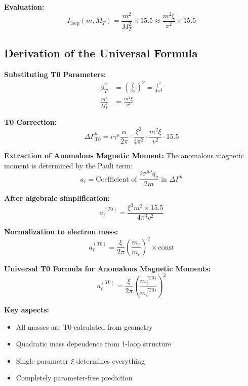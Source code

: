 \documentclass[12pt,a4paper]{article}
\numberwithin{equation}{section}
\begin{document}
	\textbf{Evaluation:}
	\begin{equation}
		I_{\text{loop}}(m,M_T) = \frac{m^2}{M_T^2} \times 15.5 \approx \frac{m^2 \xi}{v^2} \times 15.5
	\end{equation}
	
	\subsection{Derivation of the Universal Formula}
	
	\textbf{Substituting T0 Parameters:}
	\begin{align}
		\beta_T^2 &= \left(\frac{\xi}{2\pi}\right)^2 = \frac{\xi^2}{4\pi^2}\\
		\frac{m^2}{M_T^2} &= \frac{m^2 \xi}{v^2}
	\end{align}
	
	\textbf{T0 Correction:}
	\begin{equation}
		\Delta\Gamma^\mu_{\text{T0}} = i\gamma^\mu \frac{\alpha}{2\pi} \cdot \frac{\xi^2}{4\pi^2} \cdot \frac{m^2 \xi}{v^2} \cdot 15.5
	\end{equation}
	
	\textbf{Extraction of Anomalous Magnetic Moment:}
	The anomalous magnetic moment is determined by the Pauli term:
	\begin{equation}
		a_\ell = \text{Coefficient of } \frac{i\sigma^{\mu\nu}q_\nu}{2m} \text{ in } \Delta\Gamma^\mu
	\end{equation}
	
	\textbf{After algebraic simplification:}
	\begin{equation}
		a_\ell^{(T0)} = \frac{\xi^3 m^2 \times 15.5}{4\pi^3 v^2}
	\end{equation}
	
	\textbf{Normalization to electron mass:}
	\begin{equation}
		a_\ell^{(T0)} = \frac{\xi}{2\pi} \left(\frac{m_\ell}{m_e}\right)^2 \times \text{const}
	\end{equation}
	
	\begin{t0formula}
		\textbf{Universal T0 Formula for Anomalous Magnetic Moments:}
		\begin{equation}
			\boxed{a_\ell^{(T0)} = \frac{\xi}{2\pi} \left(\frac{m_\ell^{\text{(T0)}}}{m_e^{\text{(T0)}}}\right)^2}
		\end{equation}
		
		\textbf{Key aspects:}
		\begin{itemize}
			\item All masses are T0-calculated from geometry
			\item Quadratic mass dependence from 1-loop structure
			\item Single parameter $\xi$ determines everything
			\item Completely parameter-free prediction
		\end{itemize}
	\end{t0formula}
	
\end{document}
